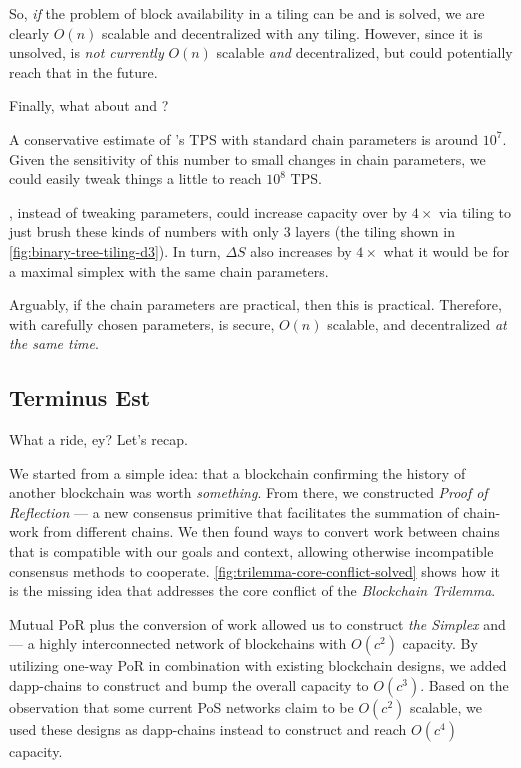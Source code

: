 So, \emph{if} the problem of block availability in a tiling can be and is solved, we are clearly $O(n)$ scalable and decentralized with any tiling.
However, since it is unsolved,  is \emph{not currently} $O(n)$ scalable \emph{and} decentralized, but could potentially reach that in the future.

Finally, what about  and ?

A conservative estimate of 's TPS with standard chain parameters is around $10^7$.
Given the sensitivity of this number to small changes in chain parameters, we could easily tweak things a little to reach $10^8$ TPS.

, instead of tweaking parameters, could increase capacity over  by $4\times$ via tiling to just brush these kinds of numbers with only 3 layers (the tiling shown in \autoref{fig:binary-tree-tiling-d3}).
In turn, $\Delta S$ also increases by $4\times$ what it would be for a maximal simplex with the same chain parameters.

Arguably, if the  chain parameters are practical, then this is practical.
{Therefore, with carefully chosen parameters,  is secure, $O(n)$ scalable, and decentralized \emph{at the same time}.}





\subsection{Terminus Est}






What a ride, ey?
Let's recap.

We started from a simple idea: that a blockchain confirming the history of another blockchain was worth \emph{something}.
From there, we constructed \emph{Proof of Reflection} --- a new consensus primitive that facilitates the summation of chain-work from different chains.
We then found ways to convert work between chains that is compatible with our goals and context, allowing otherwise incompatible consensus methods to cooperate.
\autoref{fig:trilemma-core-conflict-solved} shows how it is the missing idea that addresses the core conflict of the \emph{Blockchain Trilemma}.
%

Mutual PoR plus the conversion of work allowed us to construct \emph{the Simplex} and  --- a highly interconnected network of blockchains with $O(c^2)$ capacity.
By utilizing one-way PoR in combination with existing blockchain designs, we added dapp-chains to construct  and bump the overall capacity to $O(c^3)$.
Based on the observation that some current PoS networks claim to be $O(c^2)$ scalable, we used these designs as dapp-chains instead to construct  and reach $O(c^4)$ capacity.

